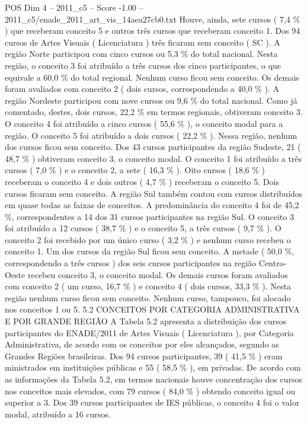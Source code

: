 \begin{textsample}{POS Dim 4 – 2011\_c5 – Score -1.00 – 2011\_c5/enade\_2011\_art\_vis\_14aea27cb0.txt}
Houve, ainda, sete cursos ( 7,4 \% ) que receberam conceito 5 e outros três cursos que receberam conceito 1.
Dos 94 cursos de Artes Visuais ( Licenciatura ) três ficaram sem conceito ( SC ).
A região Norte participou com cinco cursos ou 5,3 \% do total nacional.
Nesta região, o conceito 3 foi atribuído a três cursos dos cinco participantes, o que equivale a 60,0 \% do total regional.
Nenhum curso ficou sem conceito.
Os demais foram avaliados com conceito 2 ( dois cursos, correspondendo a 40,0 \% ).
A região Nordeste participou com nove cursos ou 9,6 \% do total nacional.
Como já comentado, destes, dois cursos, 22,2 \% em termos regionais, obtiveram conceito 3.
O conceito 4 foi atribuído a cinco cursos ( 55,6 \% ), o conceito modal para a região.
O conceito 5 foi atribuído a dois cursos ( 22,2 \% ).
Nessa região, nenhum dos cursos ficou sem conceito.
Dos 43 cursos participantes da região Sudeste, 21 ( 48,7 \% ) obtiveram conceito 3, o conceito modal.
O conceito 1 foi atribuído a três cursos ( 7,0 \% ) e o conceito 2, a sete ( 16,3 \% ).
Oito cursos ( 18,6 \% ) receberam o conceito 4 e dois outros ( 4,7 \% ) receberam o conceito 5.
Dois cursos ficaram sem conceito.
A região Sul também contou com cursos distribuídos em quase todas as faixas de conceitos.
A predominância do conceito 4 foi de 45,2 \%, correspondentes a 14 dos 31 cursos participantes na região Sul.
O conceito 3 foi atribuído a 12 cursos ( 38,7 \% ) e o conceito 5, a três cursos ( 9,7 \% ).
O conceito 2 foi recebido por um único curso ( 3,2 \% ) e nenhum curso recebeu o conceito 1.
Um dos cursos da região Sul ficou sem conceito.
A metade ( 50,0 \%, correspondendo a três cursos ) dos seis cursos participantes na região Centro-Oeste recebeu conceito 3, o conceito modal.
Os demais cursos foram avaliados com conceito 2 ( um curso, 16,7 \% ) e conceito 4 ( dois cursos, 33,3 \% ).
Nesta região nenhum curso ficou sem conceito.
Nenhum curso, tampouco, foi alocado nos conceitos 1 ou 5. 5.2 CONCEITOS POR CATEGORIA ADMINISTRATIVA E POR GRANDE REGIÃO A Tabela 5.2 apresenta a distribuição dos cursos participantes do ENADE/2011 de Artes Visuais ( Licenciatura ), por Categoria Administrativa, de acordo com os conceitos por eles alcançados, segundo as Grandes Regiões brasileiras.
Dos 94 cursos participantes, 39 ( 41,5 \% ) eram ministrados em instituições públicas e 55 ( 58,5 \% ), em privadas.
De acordo com as informações da Tabela 5.2, em termos nacionais houve concentração dos cursos nos conceitos mais elevados, com 79 cursos ( 84,0 \% ) obtendo conceito igual ou superior a 3.
Dos 39 cursos participantes de IES públicas, o conceito 4 foi o valor modal, atribuído a 16 cursos.

\end{textsample}
